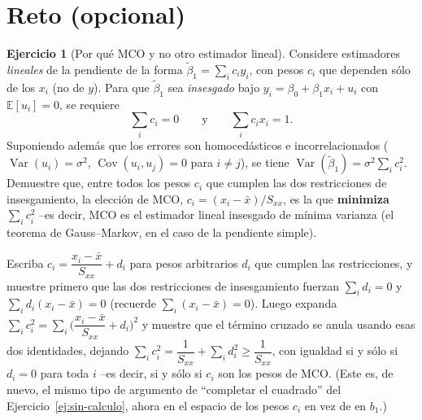 \documentclass[11pt,a4paper,oneside]{article}
\theoremstyle{plain}
\theoremstyle{definition}
\newtheorem{exercise}[teorema]{Ejercicio}
\newcommand{\Cov}{\operatorname{Cov}}
\newcommand{\Var}{\operatorname{Var}}
\newcommand{\E}{\mathbb{E}}
\begin{document}
\section{Reto (opcional)}

\begin{exercise}[Por qué MCO y no otro estimador lineal]\label{ej:blue}
Considere estimadores \emph{lineales} de la pendiente de la forma
$\tilde\beta_1=\sum_i c_i y_i$, con pesos $c_i$ que dependen sólo de los
$x_i$ (no de $y$). Para que $\tilde\beta_1$ sea \emph{insesgado} bajo
$y_i=\beta_0+\beta_1x_i+u_i$ con $\E[u_i]=0$, se requiere
\[
  \sum_i c_i = 0 \qquad \text{y} \qquad \sum_i c_i x_i = 1 .
\]
Suponiendo además que los errores son homocedásticos e incorrelacionados
($\Var(u_i)=\sigma^2$, $\Cov(u_i,u_j)=0$ para $i\neq j$), se tiene
$\Var(\tilde\beta_1)=\sigma^2\sum_i c_i^2$. Demuestre que, entre todos
los pesos $c_i$ que cumplen las dos restricciones de insesgamiento, la
elección de MCO, $c_i=(x_i-\bar x)/S_{xx}$, es la que \textbf{minimiza}
$\sum_i c_i^2$ --es decir, MCO es el estimador lineal insesgado de
mínima varianza (el teorema de Gauss--Markov, en el caso de la
pendiente simple).
\end{exercise}
\begin{hintBox}
Escriba $c_i = \dfrac{x_i-\bar x}{S_{xx}} + d_i$ para pesos arbitrarios
$d_i$ que cumplen las restricciones, y muestre primero que las dos
restricciones de insesgamiento fuerzan $\sum_i d_i=0$ y
$\sum_i d_i(x_i-\bar x)=0$ (recuerde $\sum_i(x_i-\bar x)=0$). Luego
expanda $\sum_ic_i^2=\sum_i\Big(\dfrac{x_i-\bar x}{S_{xx}}+d_i\Big)^2$ y
muestre que el término cruzado se anula usando esas dos identidades,
dejando $\sum_ic_i^2 = \dfrac{1}{S_{xx}} + \sum_id_i^2 \ge \dfrac1{S_{xx}}$,
con igualdad si y sólo si $d_i=0$ para toda $i$ --es decir, si y sólo si
$c_i$ son los pesos de MCO. (Este es, de nuevo, el mismo tipo de
argumento de ``completar el cuadrado'' del
Ejercicio~\ref{ej:sin-calculo}, ahora en el espacio de los pesos $c_i$
en vez de en $b_1$.)
\end{hintBox}
\end{document}
